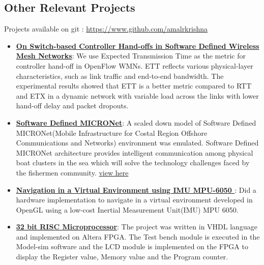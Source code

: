 \documentclass{resume}
\begin{document}
\begin{multicols}{2}
\section{Other Relevant Projects}
Projects available on git : \url{https://www.github.com/amalrkrishna}
\begin{itemize}
 \item \textbf{\href{}{On Switch-based Controller Hand-offs in Software Defined Wireless Mesh Networks}}: We use Expected Transmission Time as the metric for controller hand-off in OpenFlow WMNs. ETT reflects various physical-layer characteristics, such as link traffic and end-to-end bandwidth. The experimental results showed that ETT is a better metric compared to RTT and ETX in a dynamic network with variable load across the links with lower hand-off delay and packet dropouts.
 \item \textbf{\href{}{Software Defined MICRONet}}: A scaled down model of Software Defined MICRONet(Mobile Infrastructure for Costal Region Offshore Communications and Networks) environment was emulated. Software Defined MICRONet architecture provides intelligent communication among physical boat clusters in the sea which will solve the technology challenges faced by the fishermen community. \href{https://drive.google.com/open?id=0B7qfuVtugGPOOF9uVFRlMVRFbmc}{view here}
 \item \textbf{\href{https://github.com/amalrkrishna/virtualnav-mpu6050}{
Navigation in a Virtual Environment using IMU MPU-6050
}}: Did a hardware implementation to navigate in a virtual environment developed in OpenGL using a low-cost Inertial Measurement Unit(IMU) MPU 6050.
 \item \textbf{\href{https://github.com/amalrkrishna/32bitrisc-vhdl}{32 bit RISC Microprocessor}}: The project was written in VHDL language and implemented on Altera FPGA. The Test bench module is executed in the Model-sim software and the LCD module is implemented on the FPGA to display the Register value, Memory value and the Program counter. 
\end{itemize}
\end{multicols}
\end{document}
